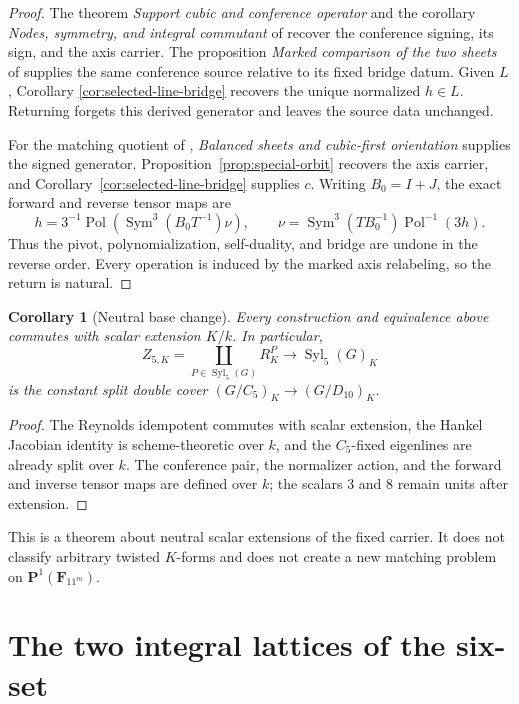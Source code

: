 \documentclass[11pt]{article}
\newtheorem{corollary}[theorem]{Corollary}
\theoremstyle{definition}
\theoremstyle{remark}
\newcommand{\F}{\mathbf F}
\newcommand{\PP}{\mathbf P}
\newcommand{\Sym}{\operatorname{Sym}}
\begin{document}
\begin{proof}
The theorem \emph{Support cubic and conference operator} and the corollary
\emph{Nodes, symmetry, and integral commutant} of \cite{RuddRigidity2026}
recover the conference signing, its sign, and the axis carrier.  The
proposition \emph{Marked comparison of the two sheets} of
\cite{RuddPassages2026} supplies the same conference source relative to its
fixed bridge datum.  Given \(L\), Corollary
\ref{cor:selected-line-bridge} recovers the unique normalized \(h\in L\).
Returning forgets this derived generator and leaves the source data
unchanged.

For the matching quotient of \cite{RuddFactorization2026}, \emph{Balanced
sheets and cubic-first orientation} supplies the signed generator.
Proposition~\ref{prop:special-orbit} recovers the axis carrier, and
Corollary~\ref{cor:selected-line-bridge} supplies \(c\).
Writing \(B_0=I+J\), the exact forward and reverse tensor maps are
\[
 h=3^{-1}\operatorname{Pol}\!\left(\Sym^3(B_0T^{-1})\nu\right),
 \qquad
 \nu=\Sym^3(TB_0^{-1})\operatorname{Pol}^{-1}(3h).
\]
Thus the pivot, polynomialization, self-duality, and bridge are undone in
the reverse order.  Every operation is induced by the marked axis
relabeling, so the return is natural.
\end{proof}

\begin{corollary}[Neutral base change]
\label{cor:stabilizer-stratified-base-change}
Every construction and equivalence above commutes with scalar extension
\(K/k\).  In particular,
\[
 Z_{5,K}=\coprod_{P\in\operatorname{Syl}_5(G)}R_K^P
       \longrightarrow \operatorname{Syl}_5(G)_K
\]
is the constant split double cover
\((G/C_5)_K\to(G/D_{10})_K\).
\end{corollary}

\begin{proof}
The Reynolds idempotent commutes with scalar extension, the Hankel Jacobian
identity is scheme-theoretic over \(k\), and the \(C_5\)-fixed eigenlines are
already split over \(k\).  The conference pair, the normalizer action, and
the forward and inverse tensor maps are defined over \(k\); the scalars \(3\)
and \(8\) remain units after extension.
\end{proof}

This is a theorem about neutral scalar extensions of the fixed carrier.  It
does not classify arbitrary twisted \(K\)-forms and does not create a new
matching problem on \(\PP^1(\F_{11^m})\).

\section{The two integral lattices of the six-set}
\label{sec:lattice-tower}
\end{document}
